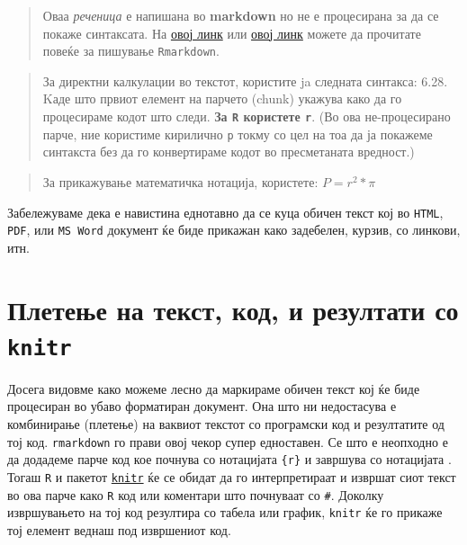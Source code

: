 \documentclass[
]{book}
\begin{document}
\begin{quote}
Оваа \emph{реченица} е напишана во \textbf{markdown} но не е процесирана за да се покаже синтаксата.
На \href{https://kbroman.org/knitr_knutshell/pages/Rmarkdown.html}{овој линк} или
\href{https://rmarkdown.rstudio.com/authoring_quick_tour.html}{овој линк} можете да
прочитате повеќе за пишување \texttt{Rmarkdown}.
\end{quote}

\begin{quote}
За директни калкулации во текстот, користите ja следната синтакса: 6.28.
Kаде што првиот елемент на парчето (chunk) укажува како да го процесираме кодот што следи.
\textbf{За \texttt{R} користете \texttt{r}}. (Во ова не-процесирано парче, ние користиме кирилично \texttt{р} токму со
цел на тоа да ја покажеме синтакста без да го конвертираме кодот во пресметаната вредност.)
\end{quote}

\begin{quote}
За прикажување математичка нотација, користете: \(P = r^2 * \pi\)
\end{quote}

Забележуваме дека е навистина еднотавно да се куца обичен текст кој во \texttt{HTML}, \texttt{PDF}, или \texttt{MS\ Word} документ ќе биде прикажан како задебелен, курзив, со линкови, итн.

\hypertarget{ux43fux43bux435ux442ux435ux45aux435-ux43dux430-ux442ux435ux43aux441ux442-ux43aux43eux434-ux438-ux440ux435ux437ux443ux43bux442ux430ux442ux438-ux441ux43e-knitr}{%
\section{\texorpdfstring{Плетење на текст, код, и резултати со \texttt{knitr}}{Плетење на текст, код, и резултати со knitr}}\label{ux43fux43bux435ux442ux435ux45aux435-ux43dux430-ux442ux435ux43aux441ux442-ux43aux43eux434-ux438-ux440ux435ux437ux443ux43bux442ux430ux442ux438-ux441ux43e-knitr}}

Досега видовме како можеме лесно да маркираме обичен текст кој ќе биде процесиран во убаво форматиран документ. Она што ни недостасува е комбинирање (плетење) на ваквиот текстот со програмски код и резултатите од тој код. \texttt{rmarkdown} го прави овој чекор супер едноставен. Се што е неопходно е да додадеме парче код кое почнува со нотацијата \texttt{\textasciigrave{}\textasciigrave{}\textasciigrave{}\{r\}} и завршува со нотацијата \texttt{\textasciigrave{}\textasciigrave{}\textasciigrave{}}. Тогаш \texttt{R} и пакетот \href{https://www.rdocumentation.org/packages/knitr/versions/1.30}{\texttt{knitr}} \citep{knitr1, knitr2, knitr3} ќе се обидат да го интерпретираат и извршат сиот текст во ова парче како \texttt{R} код или коментари што почнуваат со \texttt{\#}. Доколку извршувањето на тој код резултира со табела или график, \texttt{knitr} ќе го прикаже тој елемент веднаш под извршениот код.
\end{document}
